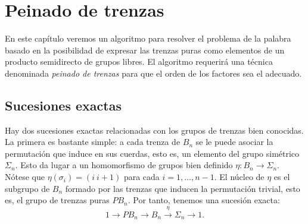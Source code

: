 \documentclass[TFG.tex]{subfiles}
\begin{document}
\chapter{Peinado de trenzas}


En este capítulo veremos un algoritmo para resolver el problema de la palabra basado en la posibilidad de expresar las trenzas puras como elementos de un producto semidirecto de grupos libres. El algoritmo requerirá una técnica denominada \emph{peinado de trenzas} para que el orden de los factores sea el adecuado.

\section{Sucesiones exactas}
Hay dos sucesiones exactas relacionadas con los grupos de trenzas bien conocidas. La primera es bastante simple: a cada trenza de $B_n$ se le puede asociar la permutación que induce en sus cuerdas, esto es, un elemento del grupo simétrico $\Sigma_n$. Esto da lugar a un homomorfismo de grupos bien definido $\eta: B_n\to \Sigma_n$. Nótese que $\eta(\sigma_i)=(i\ i+1)$ para cada $i=1,\dots, n-1$. El núcleo de $\eta$ es el subgrupo de $B_n$ formado por las trenzas que inducen la permutación trivial, esto es, el grupo de trenzas puras $PB_n$. Por tanto, tenemos una sucesión exacta:
\begin{equation}\label{extension}
1\to PB_n\to B_n\overset{\eta}{\to}\Sigma_n\to 1.
\end{equation}
\end{document}
